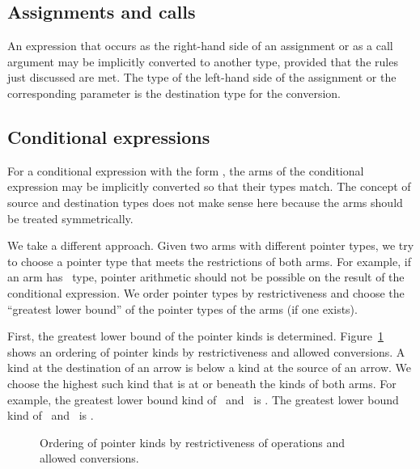 \subsection{Assignments and calls}

An expression that occurs as the right-hand side of an assignment or as
a call argument may be implicitly converted to another type, provided
that the rules just discussed are met.
The type of the left-hand side of the assignment or the corresponding
parameter is the destination type for the conversion.

\subsection{Conditional expressions}

For a conditional expression with the form   
\code{:} , the arms of the conditional expression may be implicitly
converted so that their types  match.  The concept of source and destination types
does not make sense here because the arms should be treated symmetrically.

We take a different approach.  Given two arms with different pointer types, we try
to choose a pointer type that meets the restrictions of both arms.  For example, if
an arm has \ptr\ type, pointer arithmetic should not be possible on the result
of the conditional expression.   We order pointer types by restrictiveness
and choose the ``greatest lower bound'' of the pointer types of the arms (if one exists).

First, the greatest lower bound of the pointer kinds is determined.
Figure~\ref{fig:pointer-kind-ordering} shows an ordering  of pointer kinds by
restrictiveness and allowed conversions.   A kind at the destination of an arrow is below a kind
at the source of an arrow.  We choose the highest such kind that is at or beneath the
kinds of both arms.   For example, the greatest lower bound
kind of \ptr\ and \uncheckedptr\ is \ptr. The greatest lower bound kind
of \uncheckedptr\ and \ntarrayptr\ is \arrayptr.
\begin{figure}
\begin{center}
\end{center}
\caption{Ordering of pointer kinds by restrictiveness of operations and allowed conversions.}
\label{fig:pointer-kind-ordering}
\end{figure}

